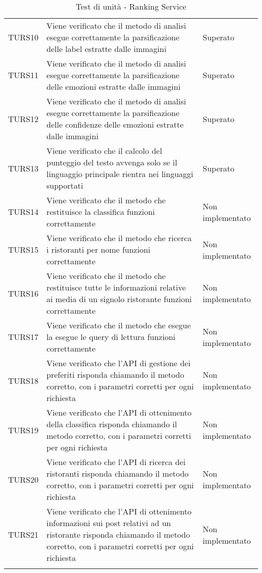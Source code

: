 \begin{longtable}{ m{}<{\centering}  m{}<{\centering}  m{}<{\centering} }
    TURS10 & Viene verificato che il metodo di analisi esegue correttamente la parsificazione delle label estratte dalle immagini & Superato \\

    TURS11 & Viene verificato che il metodo di analisi esegue correttamente la parsificazione delle emozioni estratte dalle immagini & Superato \\

    TURS12 & Viene verificato che il metodo di analisi esegue correttamente la parsificazione delle confidenze delle emozioni estratte dalle immagini & Superato \\

    TURS13 & Viene verificato che il calcolo del punteggio del testo avvenga solo se il linguaggio principale rientra nei linguaggi supportati & Superato \\

    TURS14 & Viene verificato che il metodo che restituisce la classifica funzioni correttamente & Non implementato \\
    
    TURS15 & Viene verificato che il metodo che ricerca i ristoranti per nome funzioni correttamente & Non implementato \\
    
    TURS16 & Viene verificato che il metodo che restituisce tutte le informazioni relative ai media di un signolo ristorante funzioni correttamente & Non implementato \\
    
    TURS17 & Viene verificato che il metodo che esegue la esegue le query di lettura funzioni correttamente & Non implementato \\
    
    TURS18 & Viene verificato che l'API di gestione dei preferiti risponda chiamando il metodo corretto, con i parametri corretti per ogni richiesta & Non implementato \\
    
     TURS19 & Viene verificato che l'API di ottenimento della classifica risponda chiamando il metodo corretto, con i parametri corretti per ogni richiesta & Non implementato \\
     
     TURS20 & Viene verificato che l'API di ricerca dei ristoranti risponda chiamando il metodo corretto, con i parametri corretti per ogni richiesta & Non implementato \\
     
     TURS21 & Viene verificato che l'API di ottenimento informazioni sui post relativi ad un ristorante risponda chiamando il metodo corretto, con i parametri corretti per ogni richiesta & Non implementato \\

    \caption{Test di unità - Ranking Service}
\end{longtable}	

